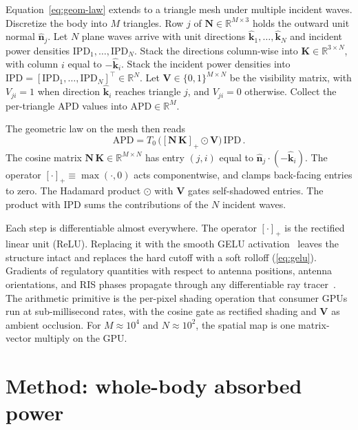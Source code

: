 \documentclass[journal,twocolumn,10pt]{IEEEtran}
\newcommand{\khat}{\hat{\bm{k}}}
\newcommand{\nhat}{\hat{\bm{n}}}
\newcommand{\IPD}{\mathrm{IPD}}
\newcommand{\pospart}[1]{\left[#1\right]_{+}}
\begin{document}
Equation~\eqref{eq:geom-law} extends to a triangle mesh under
multiple incident waves. Discretize the body into $M$ triangles. Row $j$ of
$\mathbf{N} \in \mathbb{R}^{M\times 3}$ holds the outward unit
normal $\nhat_j$. Let $N$ plane waves arrive with unit directions
$\khat_1, \ldots, \khat_N$ and incident power densities
$\IPD_1, \ldots, \IPD_N$.
Stack the directions column-wise into
$\mathbf{K} \in \mathbb{R}^{3\times N}$, with column $i$ equal to
$-\khat_i$. Stack the incident power densities into
$\bm{\mathrm{IPD}} = [\IPD_1,\ldots,\IPD_N]^\top \in \mathbb{R}^N$. Let
$\mathbf{V} \in \{0,1\}^{M\times N}$ be the visibility matrix, with
$V_{ji} = 1$ when direction $\khat_i$ reaches triangle $j$, and
$V_{ji} = 0$ otherwise. Collect the per-triangle APD values into
$\bm{\mathrm{APD}} \in \mathbb{R}^{M}$.

The geometric law on the mesh then reads
\begin{equation}\label{eq:mat-multi}
  \bm{\mathrm{APD}} = T_0\,\bigl(\pospart{\mathbf{N}\,\mathbf{K}}
  \odot \mathbf{V}\bigr)\,\bm{\mathrm{IPD}}\, .
\end{equation}
The cosine matrix $\mathbf{N}\,\mathbf{K} \in \mathbb{R}^{M\times N}$
has entry $(j,i)$ equal to $\nhat_j\cdot(-\khat_i)$. The operator
$\pospart{\cdot} \equiv \max(\cdot,0)$ acts componentwise, and clamps
back-facing entries to zero. The Hadamard product $\odot$ with
$\mathbf{V}$ gates self-shadowed entries. The product with
$\bm{\mathrm{IPD}}$ sums the contributions of the $N$ incident waves.

Each step is differentiable almost everywhere. The operator $\pospart{\cdot}$ is the
rectified linear unit (ReLU). Replacing it with the smooth
\gls{GELU} activation~\cite{Hendrycks2016} leaves the structure
intact and replaces the hard cutoff with a soft rolloff
(\cref{eq:gelu}). Gradients of regulatory quantities with respect to
antenna positions, antenna orientations, and RIS phases propagate
through any differentiable ray tracer~\cite{SionnaRT}. The arithmetic
primitive is the per-pixel shading operation that consumer GPUs run
at sub-millisecond rates, with the cosine gate as rectified shading
and $\mathbf{V}$ as ambient occlusion. For $M \approx 10^4$ and
$N \approx 10^2$, the spatial map is one matrix-vector multiply on
the GPU.

\section{Method: whole-body absorbed power}\label{sec:cauchy}
\end{document}
